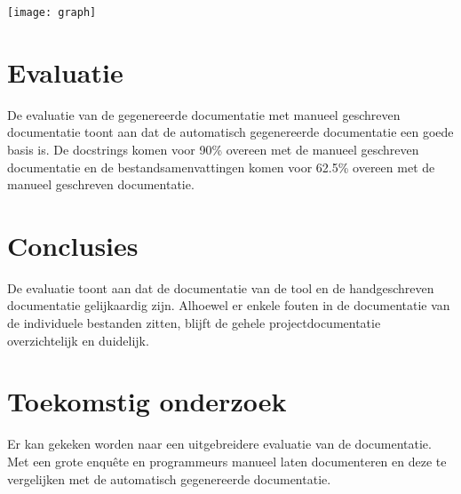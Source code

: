 \documentclass[a0,portrait]{hogent-poster}
\begin{document}
\begin{multicols}{2}
\begin{center}
  \captionsetup{type=figure}
  \texttt{[image: graph]}
  \label{fig:graaf}
\end{center}

\section{Evaluatie}

De evaluatie van de gegenereerde documentatie met manueel geschreven documentatie toont aan dat de automatisch gegenereerde documentatie een goede basis is.
De docstrings komen voor 90\% overeen met de manueel geschreven documentatie en de bestandsamenvattingen komen voor 62.5\% overeen met de manueel geschreven documentatie.

\section{Conclusies}
De evaluatie toont aan dat de documentatie van de tool en de handgeschreven documentatie gelijkaardig zijn. 
Alhoewel er enkele fouten in de documentatie van de individuele bestanden zitten, blijft
de gehele projectdocumentatie overzichtelijk en duidelijk.

\section{Toekomstig onderzoek}
Er kan gekeken worden naar een uitgebreidere evaluatie van de documentatie. 
Met een grote enquête en programmeurs manueel laten documenteren en deze te vergelijken met de automatisch gegenereerde documentatie.

\end{multicols}
\end{document}

